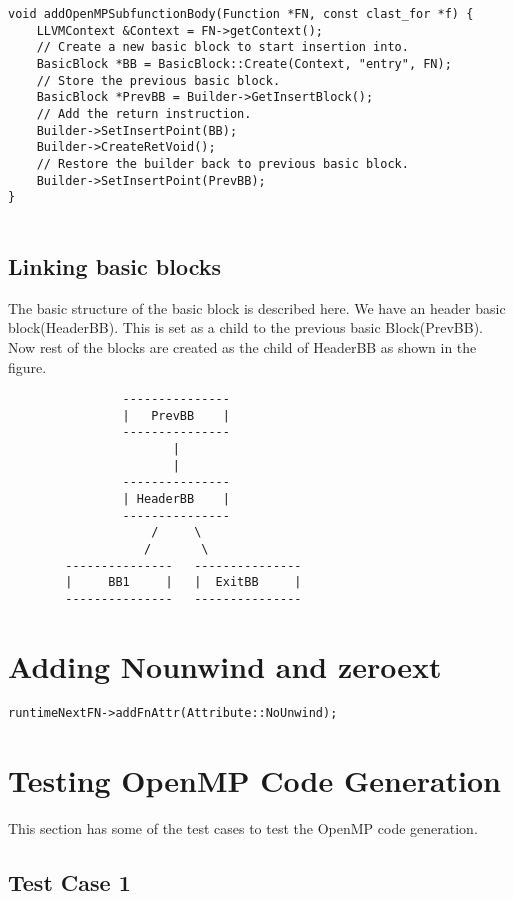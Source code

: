 \documentclass[a4paper,10pt]{article}
\begin{document}
\begin{verbatim}
void addOpenMPSubfunctionBody(Function *FN, const clast_for *f) {
    LLVMContext &Context = FN->getContext();
    // Create a new basic block to start insertion into.
    BasicBlock *BB = BasicBlock::Create(Context, "entry", FN);
    // Store the previous basic block.
    BasicBlock *PrevBB = Builder->GetInsertBlock();
    // Add the return instruction.
    Builder->SetInsertPoint(BB);
    Builder->CreateRetVoid();
    // Restore the builder back to previous basic block.
    Builder->SetInsertPoint(PrevBB);
}


\end{verbatim}

\subsection{Linking basic blocks}

The basic structure of the basic block is described here. We have an header basic block(HeaderBB). This is set as a child to the previous basic Block(PrevBB). 
Now rest of the blocks are created as the child of HeaderBB as shown in the figure.
\begin{verbatim}
                ---------------
                |   PrevBB    |
                ---------------
                       |
                       |
                ---------------
                | HeaderBB    |
                ---------------
                   	/     \
                   /       \
        ---------------   ---------------
        |     BB1     |   |  ExitBB     |
        ---------------   ---------------
\end{verbatim}	
\section{Adding Nounwind and zeroext}
\begin{verbatim}
runtimeNextFN->addFnAttr(Attribute::NoUnwind);
\end{verbatim}

\section{Testing OpenMP Code Generation}

This section has some of the test cases to test the OpenMP code generation.

\subsection{Test Case 1}
\end{document}
